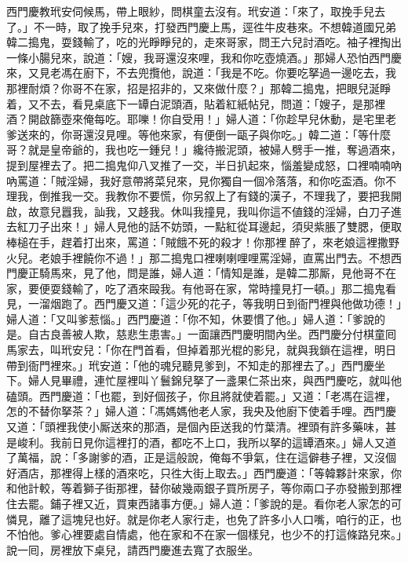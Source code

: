 西門慶教玳安伺候馬，帶上眼紗，問棋童去沒有。玳安道：「來了，取挽手兒去了。」不一時，取了挽手兒來，打發西門慶上馬，逕徃牛皮巷來。不想韓道國兄弟韓二搗鬼，耍錢輸了，吃的光睜睜兒的，走來哥家，問王六兒討酒吃。袖子裡掏出一條小腸兒來，說道：「嫂，我哥還沒來哩，我和你吃壺燒酒。」那婦人恐怕西門慶來，又見老馮在廚下，不去兜攬他，說道：「我是不吃。你要吃拏過一邊吃去，我那裡耐煩？你哥不在家，招是招非的，又來做什麼？」那韓二搗鬼，把眼兒涎睜着，又不去，看見桌底下一罈白泥頭酒，貼着紅紙帖兒，問道：「嫂子，是那裡酒？開啟篩壺來俺每吃。耶嚛！你自受用！」婦人道：「你趁早兒休動，是宅里老爹送來的，你哥還沒見哩。等他來家，有便倒一甌子與你吃。」韓二道：「等什麼哥？就是皇帝爺的，我也吃一鍾兒！」纔待搬泥頭，被婦人劈手一推，奪過酒來，提到屋裡去了。把二搗鬼仰八叉推了一交，半日扒起來，惱羞變成怒，口裡喃喃吶吶罵道：「賊淫婦，我好意帶將菜兒來，見你獨自一個冷落落，和你吃盃酒。你不理我，倒推我一交。我教你不要慌，你另叙上了有錢的漢子，不理我了，要把我開啟，故意兒囂我，訕我，又趍我。休叫我撞見，我叫你這不値錢的淫婦，白刀子進去紅刀子出來！」婦人見他的話不妨頭，一點紅從耳邊起，須臾紫脹了雙腮，便取棒槌在手，趕着打出來，{}罵道：「賊餓不死的殺才！你那裡𠳹醉了，來老娘這裡撒野火兒。老娘手裡饒你不過！」那二搗鬼口裡喇喇哩哩罵淫婦，直罵出門去。不想西門慶正騎馬來，見了他，問是誰，婦人道：「情知是誰，是韓二那厮，見他哥不在家，要便耍錢輸了，吃了酒來毆我。有他哥在家，常時撞見打一頓。」那二搗鬼看見，一溜烟跑了。西門慶又道：「這少死的花子，等我明日到衙門裡與他做功德！」婦人道：「又叫爹惹惱。」西門慶道：「你不知，休要慣了他。」婦人道：「爹說的是。自古良善被人欺，慈悲生患害。」一面讓西門慶明間內坐。西門慶分付棋童囘馬家去，叫玳安兒：「你在門首看，但掉着那光棍的影兒，就與我鎖在這裡，明日帶到衙門裡來。」玳安道：「他的魂兒聽見爹到，不知走的那裡去了。」西門慶坐下。婦人見畢禮，連忙屋裡叫丫鬟錦兒拏了一盞果仁茶出來，與西門慶吃，就叫他磕頭。西門慶道：「也罷，到好個孩子，你且將就使着罷。」又道：「老馮在這裡，怎的不替你拏茶？」婦人道：「馮媽媽他老人家，我央及他廚下使着手哩。西門慶又道：「頭裡我使小厮送來的那酒，是個內臣送我的竹葉清。裡頭有許多藥味，甚是峻利。我前日見你這裡打的酒，都吃不上口，我所以拏的這罈酒來。」婦人又道了萬福，說：「多謝爹的酒，正是這般說，俺每不爭氣，住在這僻巷子裡，又沒個好酒店，那裡得上樣的酒來吃，只徃大街上取去。」西門慶道：「等韓夥計來家，你和他計較，等着獅子街那裡，替你破幾兩銀子買所房子，等你兩口子亦發搬到那裡住去罷。鋪子裡又近，買東西諸事方便。」婦人道：「爹說的是。看你老人家怎的可憐見，離了這塊兒也好。就是你老人家行走，也免了許多小人口嘴，咱行的正，也不怕他。{}爹心裡要處自情處，他在家和不在家一個樣兒，也少不的打這條路兒來。」{}說一囘，房裡放下桌兒，請西門慶進去寬了衣服坐。

